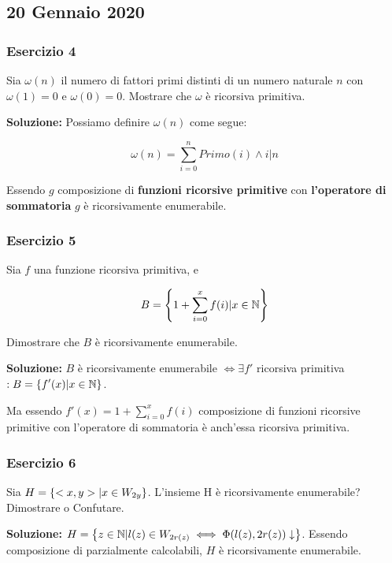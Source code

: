 \subsection{20 Gennaio 2020}

\subsubsection{Esercizio 4}

Sia \(\omega(n)\) il numero di fattori primi distinti di un numero naturale \(n\) con \(\omega(1)=0\) e \(\omega(0)=0\). Mostrare che \(\omega\) è ricorsiva primitiva.

\textbf{Soluzione:} Possiamo definire \(\omega(n)\) come segue:

\begin{equation}
  \omega(n) = \sum_{i=0}^{n} Primo(i) \land i\vert n
\end{equation}

Essendo \(g\) composizione di \textbf{funzioni ricorsive primitive} con \textbf{l'operatore di sommatoria} \(g\) è ricorsivamente enumerabile.

\subsubsection{Esercizio 5}

Sia \(f\) una funzione ricorsiva primitiva, e

\begin{equation}
  B=\displaystyle{\left\{{1+\sum_{i=0}^{x} f(i) \vert x \in \mathbb{N}}\right\}}
\end{equation}

Dimostrare che \(B\) è ricorsivamente enumerabile.

\textbf{Soluzione: } \(B\) è ricorsivamente enumerabile \(\iff \exists f'\) ricorsiva primitiva \(: B=\displaystyle{\left\{{f'(x) \vert x \in \mathbb{N}}\right\}}\).

Ma essendo \(f'(x)=1+\sum_{i=0}^{x} f(i)\) composizione di funzioni ricorsive primitive con l'operatore di sommatoria è anch'essa ricorsiva primitiva.

\subsubsection{Esercizio 6}

Sia \(H=\displaystyle{\left\{{<x,y> \vert x \in W_{2y}}\right\}}\). L'insieme H è ricorsivamente enumerabile? Dimostrare o Confutare.

\textbf{Soluzione: } \(H=\displaystyle{\left\{{z \in \mathbb{N}\vert l(z) \in W_{2r(z)} \iff \Phi(l(z), 2r(z)) \downarrow}\right\}}\). Essendo composizione di parzialmente calcolabili, \(H\) è ricorsivamente enumerabile.


